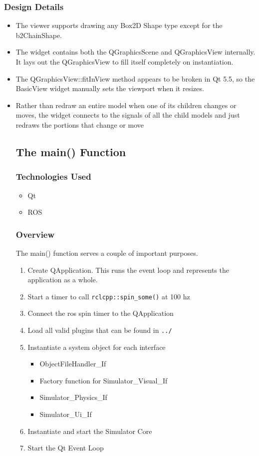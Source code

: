 \subsubsection*{Design Details}
\begin{itemize}
	\item The viewer supports drawing any Box2D Shape type except for the b2ChainShape. 
	\item The widget contains both the QGraphicsScene and QGraphicsView internally. It lays out the QGraphicsView to fill itself completely on instantiation.
	\item The QGraphicsView::fitInView method appears to be broken in Qt 5.5, so the BasicView widget manually sets the viewport when it resizes.
	\item Rather than redraw an entire model when one of its children changes or moves, the widget connects to the signals of all the child models and just redraws the portions that change or move

\subsection{The main() Function}
\subsubsection*{Technologies Used}
\begin{itemize}
	\item Qt
	\item ROS
\end{itemize}

\subsubsection*{Overview}
The main() function serves a couple of important purposes.
\begin{enumerate}
	\item Create QApplication. This runs the event loop and represents the application as a whole.
	\item Start a timer to call \lstinline|rclcpp::spin_some()| at 100 hz
	\item Connect the ros spin timer to the QApplication
	\item Load all valid plugins that can be found in \lstinline|../|
	\item Instantiate a system object for each interface
	\begin{itemize}
		\item ObjectFileHandler\_If
		\item Factory function for Simulator\_Visual\_If
		\item Simulator\_Physics\_If
		\item Simulator\_Ui\_If
	\end{itemize}
	\item Instantiate and start the Simulator Core
	\item Start the Qt Event Loop
\end{enumerate}


\end{itemize}
